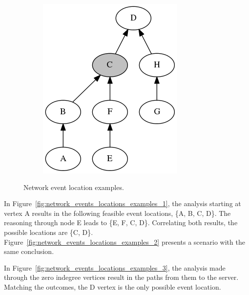 \begin{figure}[H]
{\begin{subfigure}[b]{0.3\textwidth}
            \includegraphics[width=\textwidth]{./figures/methodology/spatial_time_correlation/event_tree_graph_4.png}
            \caption{}\label{fig:network_events_locations_examples_4}
        \end{subfigure}%
    }
    \caption{Network event location examples.}
\label{fig:network_events_locations_examples}
\end{figure}%

In Figure~\ref{fig:network_events_locations_examples_1}, the analysis
starting at vertex A results in the following feasible event locations,
\{A, B, C, D\}. The reasoning through node E leads to
\{E, F, C, D\}. Correlating both results, the possible locations are \{C, D\}.
Figure~\ref{fig:network_events_locations_examples_2} presents a scenario with
the same conclusion.

In Figure~\ref{fig:network_events_locations_examples_3}, the analysis made
through the zero indegree vertices result in the paths from them to the server.
Matching the outcomes, the D vertex is the only possible event location.

